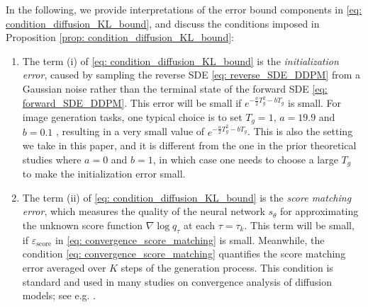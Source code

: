 \documentclass[11pt]{article}
\begin{document}
In the following, we provide interpretations of the error bound components in \eqref{eq: condition_diffusion_KL_bound}, and discuss the conditions imposed in Proposition \ref{prop: condition_diffusion_KL_bound}:
\begin{enumerate}
    \item The term (i) of \eqref{eq: condition_diffusion_KL_bound} is the \textit{initialization error}, caused by sampling the reverse SDE \eqref{eq: reverse_SDE_DDPM} from a Gaussian noise rather than the terminal state of the forward SDE \eqref{eq: forward_SDE_DDPM}. This error will be small if $e^{-\frac{a}{2}T_g^2 - bT_g}$ is small. For image generation tasks, one typical choice is to set $T_g=1$, $a=19.9$ and $b=0.1$ \cite[Appendix C]{songscore}, resulting in a very small value of $e^{-\frac{a}{2}T_g^2 - bT_g}$. This is also the setting we take in this paper, and it is different from the one in the prior theoretical studies \citep{bentonnearly, chen2023improved} where $a=0$ and $b=1$, in which case one needs to choose a large $T_g$ to make the initialization error small.




    \item The term (ii) of \eqref{eq: condition_diffusion_KL_bound} is the \textit{score matching error}, which measures the quality of the neural network $s_\theta$ for approximating the unknown score function $\nabla\log q_\tau$ at each $\tau=\tau_k$. This term will be small, if $\varepsilon_{\text{score}}$ in
    \eqref{eq: convergence_score_matching} is small. Meanwhile, the condition \eqref{eq: convergence_score_matching} quantifies the score matching error averaged over $K$ steps of the generation process. This condition is standard and used in many studies on convergence analysis of diffusion models; see e.g. \cite{chen2023sampling, bentonnearly, chen2023improved, gao2025wasserstein}. 




\end{enumerate}
\end{document}
